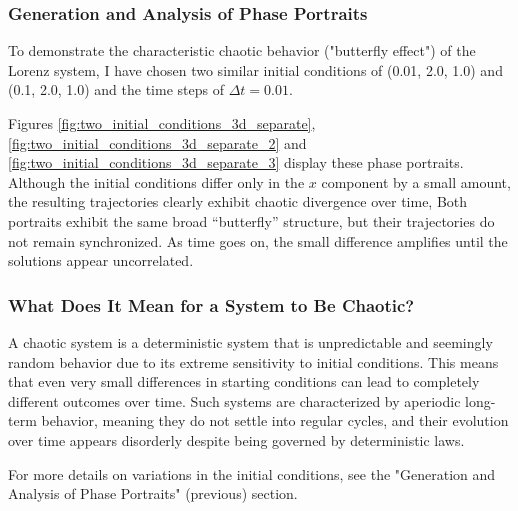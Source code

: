 \subsubsection{Generation and Analysis of Phase Portraits}
To demonstrate the characteristic chaotic behavior ("butterfly effect") of the Lorenz system, I have chosen two similar initial conditions of (0.01, 2.0, 1.0) and (0.1, 2.0, 1.0) and the time steps of \(\Delta t = 0.01\).

Figures \ref{fig:two_initial_conditions_3d_separate}, \ref{fig:two_initial_conditions_3d_separate_2} and \ref{fig:two_initial_conditions_3d_separate_3} display these phase portraits. Although the initial conditions differ only in the $x$ component by a small amount, the resulting trajectories clearly exhibit chaotic divergence over time, Both portraits exhibit the same broad “butterfly” structure, but their trajectories do not remain synchronized. As time goes on, the small difference amplifies until the solutions appear uncorrelated.

\subsubsection{What Does It Mean for a System to Be Chaotic?}
A chaotic system is a deterministic system that is unpredictable and seemingly random behavior due to its extreme sensitivity to initial conditions. This means that even very small differences in starting conditions can lead to completely different outcomes over time. Such systems are characterized by aperiodic long-term behavior, meaning they do not settle into regular cycles, and their evolution over time appears disorderly despite being governed by deterministic laws.

For more details on variations in the initial conditions, see the "Generation and Analysis of Phase Portraits" (previous) section.